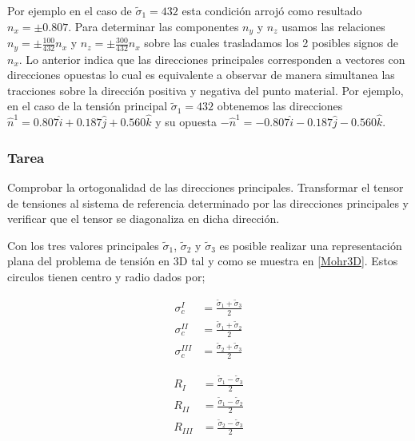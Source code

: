 \documentclass[../notas medios.tex]{subfiles}
\begin{document}
Por ejemplo en el caso de ${{\tilde \sigma }_1} = 432$ esta condición arrojó como resultado ${n_x} =  \pm 0.807$. Para determinar las componentes ${n_y}$ y ${n_z}$ usamos las relaciones ${n_y} = \pm \frac{{100}}{{432}}{n_x}$ y ${n_z} = \pm \frac{{300}}{{432}}{n_x}$ sobre las cuales trasladamos los 2 posibles signos de ${n_x}$. Lo anterior indica que las direcciones principales corresponden a vectores con direcciones opuestas lo cual es equivalente a observar de manera simultanea las tracciones sobre la dirección positiva y negativa del punto material. Por ejemplo, en el caso de la tensión principal ${{\tilde \sigma }_1} = 432$ obtenemos las direcciones ${{\hat n}^1} = 0.807\hat i + 0.187\hat j + 0.560\hat k$ y su opuesta ${{-\hat n}^1} = -0.807\hat i - 0.187\hat j - 0.560\hat k$.

\subsubsection{Tarea}
Comprobar la ortogonalidad de las direcciones principales.
Transformar el tensor de tensiones al sistema de referencia determinado por las direcciones principales y verificar que el tensor se diagonaliza en dicha dirección. 


Con los tres valores principales ${{\tilde \sigma }_1}$, ${{\tilde \sigma }_2}$ y  ${{\tilde \sigma }_3}$ es posible realizar una representación plana del problema de tensión en 3D tal y como se muestra en \cref{Mohr3D}. Estos circulos tienen centro y radio dados por;

\begin{align*}
\sigma _c^I & = \frac{{{{\tilde \sigma }_1} + {{\tilde \sigma }_3}}}{2} \\
\sigma _c^{II} & = \frac{{{{\tilde \sigma }_1} + {{\tilde \sigma }_2}}}{2} \\
\sigma _c^{III} & = \frac{{{{\tilde \sigma }_2} + {{\tilde \sigma }_3}}}{2}
\end{align*}

\begin{align*}
{R_I}& = \frac{{{{\tilde \sigma }_1} - {{\tilde \sigma }_3}}}{2}\\
{R_{II}}& = \frac{{{{\tilde \sigma }_1} - {{\tilde \sigma }_2}}}{2}\\
{R_{III}}& = \frac{{{{\tilde \sigma }_2} - {{\tilde \sigma }_3}}}{2}
\end{align*}
\end{document}
